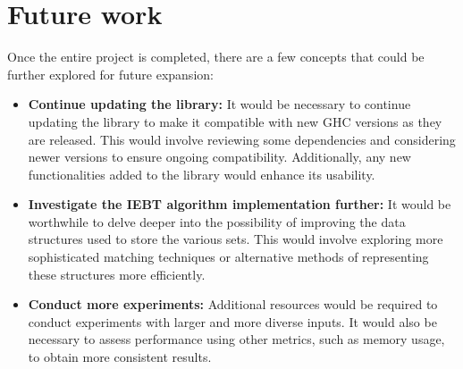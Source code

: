 \section{Future work}
Once the entire project is completed, there are a few concepts that could be further explored for future expansion:
\begin{itemize}
    \item \textbf{Continue updating the library:}  It would be necessary to continue updating the library to make it compatible with new GHC versions as they are released. This would involve reviewing some dependencies and considering newer versions to ensure ongoing compatibility. Additionally, any new functionalities added to the library would enhance its usability.

    \item \textbf{Investigate the IEBT algorithm implementation further:}  It would be worthwhile to delve deeper into the possibility of improving the data structures used to store the various sets. This would involve exploring more sophisticated matching techniques or alternative methods of representing these structures more efficiently.

    \item \textbf{Conduct more experiments:}  Additional resources would be required to conduct experiments with larger and more diverse inputs. It would also be necessary to assess performance using other metrics, such as memory usage, to obtain more consistent results.
\end{itemize}